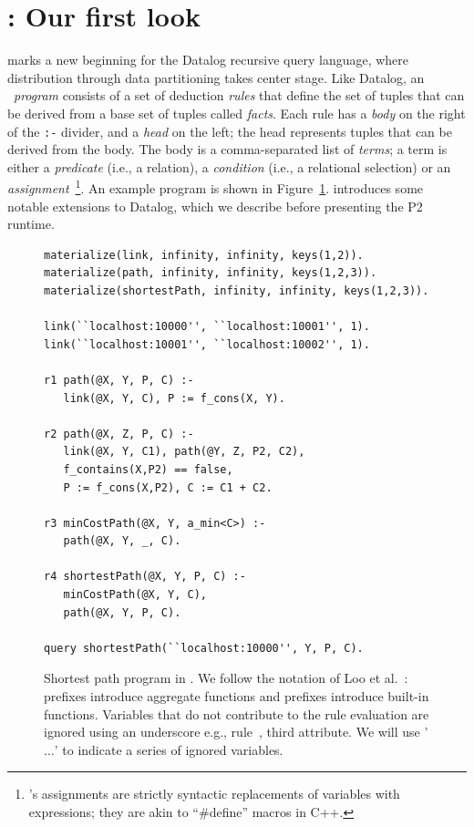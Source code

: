 \section{\OVERLOG: Our first look}
\label{ch:p2:sec:overlog}

\OVERLOG marks a new beginning for the Datalog recursive query language, where
distribution through data partitioning takes center stage.  Like Datalog, an
\OVERLOG~{\em program} consists of a set of deduction {\em rules} that define
the set of tuples that can be derived from a base set of tuples called {\em
facts}.  Each rule has a {\em body} on the right of the \texttt{:-} divider,
and a {\em head} on the left; the head represents tuples that can be derived
from the body.  The body is a comma-separated list of {\em terms}; a term is
either a {\em predicate} (i.e., a relation), a {\em condition} (i.e., a
relational selection) or an {\em assignment}~\footnote{\OVERLOG's assignments
are strictly syntactic replacements of variables with expressions; they are
akin to ``\#define'' macros in C++.}.  An example \OVERLOG program is shown in
Figure~\ref{ch:p2:fig:overlogSP}.  \OVERLOG introduces some notable extensions
to Datalog, which we describe before presenting the P2 runtime.

\begin{figure}
\ssp
\begin{lstlisting}
materialize(link, infinity, infinity, keys(1,2)).
materialize(path, infinity, infinity, keys(1,2,3)).
materialize(shortestPath, infinity, infinity, keys(1,2,3)).

link(``localhost:10000'', ``localhost:10001'', 1).
link(``localhost:10001'', ``localhost:10002'', 1).

r1 path(@X, Y, P, C) :-
   link(@X, Y, C), P := f_cons(X, Y).

r2 path(@X, Z, P, C) :-
   link(@X, Y, C1), path(@Y, Z, P2, C2),
   f_contains(X,P2) == false,
   P := f_cons(X,P2), C := C1 + C2.

r3 minCostPath(@X, Y, a_min<C>) :-
   path(@X, Y, _, C).

r4 shortestPath(@X, Y, P, C) :-
   minCostPath(@X, Y, C), 
   path(@X, Y, P, C).

query shortestPath(``localhost:10000'', Y, P, C).
\end{lstlisting}
\caption{\label{ch:p2:fig:overlogSP}Shortest path program in \OVERLOG. We
follow the notation of Loo et al.~\cite{boon-thesis}: 
prefixes introduce aggregate functions and  prefixes introduce
built-in functions. Variables that do not contribute to the rule evaluation
are ignored using an underscore e.g., rule~, third  attribute.
We will use '$\ldots$' to indicate a series of ignored variables. }
\end{figure}

